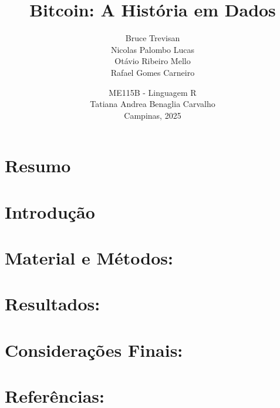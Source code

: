 \documentclass[12pt]{article}
\title{Bitcoin: A História em Dados}
\author{Bruce Trevisan \\ 
        Nicolas Palombo Lucas \\ 
        Otávio Ribeiro Mello \\ 
        Rafael Gomes Carneiro}
\date{ME115B - Linguagem R \\ 
        Tatiana Andrea Benaglia Carvalho \\ 
        Campinas, 2025}
\begin{document}



\newpage

\section{\textbf{Resumo}}



\newpage


\section{\textbf{Introdução}}



\section{\textbf{Material e Métodos:}}



\section{\textbf{Resultados:}}



\section{\textbf{Considerações Finais:}}



\newpage

\section{\textbf{Referências:}}


\end{document}
